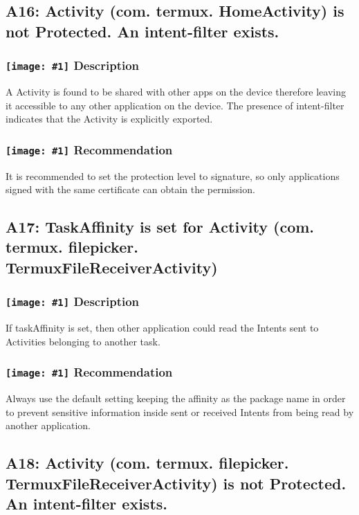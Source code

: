 \documentclass[12p]{article}
\newcommand{\icon}[1]{\texttt{[image: \#1]}}
\begin{document}
\subsection{A16: Activity (com. termux. HomeActivity) is not Protected. An intent-filter exists.}
\subsubsection*{\protect\icon{/home/miki/Documents/GITHUB/AndroidPermissions/python/vulns/report_icons/basic_sheet.png} Description}
A Activity is found to be shared with other apps on the device therefore leaving it accessible to any other application on the device. The presence of intent-filter indicates that the Activity is explicitly exported.
\subsubsection*{\protect\icon{/home/miki/Documents/GITHUB/AndroidPermissions/python/vulns/report_icons/basic_todo.png} Recommendation}
It is recommended to set the protection level to signature, so only applications signed with the same certificate can obtain the permission.
\subsection{A17: TaskAffinity is set for Activity (com. termux. filepicker. TermuxFileReceiverActivity)}
\subsubsection*{\protect\icon{/home/miki/Documents/GITHUB/AndroidPermissions/python/vulns/report_icons/basic_sheet.png} Description}
If taskAffinity is set, then other application could read the Intents sent to Activities belonging to another task.
\subsubsection*{\protect\icon{/home/miki/Documents/GITHUB/AndroidPermissions/python/vulns/report_icons/basic_todo.png} Recommendation}
Always use the default setting keeping the affinity as the package name in order to prevent sensitive information inside sent or received Intents  from being read by another application.
\subsection{A18: Activity (com. termux. filepicker. TermuxFileReceiverActivity) is not Protected. An intent-filter exists.}
\end{document}
